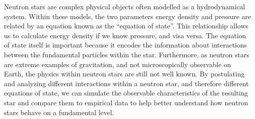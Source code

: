 Neutron stars are complex physical objects often modelled as a hydrodynamical system. Within these models, the two parameters energy density and pressure are related by an equation known as the ``equation of state''. This relationship allows us to calculate energy density if we know pressure, and visa versa. The equation of state itself is important because it encodes the information about interactions between the fundamental particles within the star. Furthermore, as neutron stars are extreme examples of gravitation, and not microscopically observable on Earth, the physics within neutron stars are still not well known. By postulating and analyzing different interactions within a neutron star, and therefore different equations of state, we can simulate the observable characteristics of the resulting star and compare them to empirical data to help better understand how neutron stars behave on a fundamental level.